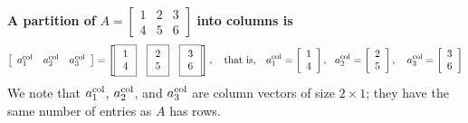 \textbf{A partition of} $A=\left[\begin{array}{ccc} 1 & 2 & 3\\
4 & 5 & 6 \end{array}\right]$ \textbf{into columns is} 
$$\left[\begin{array}{ccc} a_1^{\rm col} & a_2^{\rm col} & a_3^{\rm col}\end{array}\right]  = \left[ \boxed{\begin{array}{c} 1 \\ 4\end{array} }~~~
\boxed{ \begin{array}{c} 2 \\ 5\end{array} }~~~
\boxed{ \begin{array}{c} 3 \\ 6\end{array} }\right],~~~\text{that is,}~~~a_1^{\rm col}=\left[\begin{array}{c} 1\\
4 \end{array}\right],~~a_2^{\rm col}=\left[\begin{array}{c} 2\\
5 \end{array}\right],~~~a_3^{\rm col}=\left[\begin{array}{c} 3\\
6 \end{array}\right]
$$
We note that $a_1^{\rm col}$, $a_2^{\rm col}$, and $a_3^{\rm col}$ are column vectors of size $2 \times 1$; they have the same number of entries as $A$ has rows. \\


